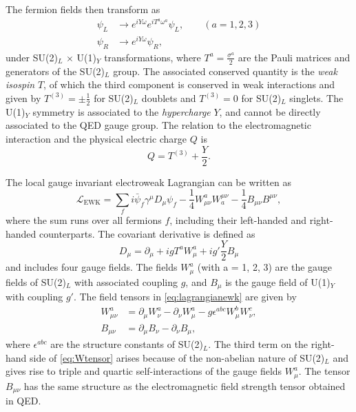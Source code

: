 \noindent The fermion fields then transform as
\begin{align}
  \psi_L & \rightarrow e^{iY\omega} e^{iT^a\omega^a} \psi_L, \qquad (a = 1, 2, 3) \\
  \psi_R & \rightarrow e^{iY\omega} \psi_R,
\end{align}
under SU(2)$_L$ $\times$ U(1)$_Y$ transformations, where $T^a=\frac{\sigma^a}{2}$ are the Pauli matrices and generators of the SU(2)$_L$ group.
The associated conserved quantity is the \emph{weak isospin} $T$, of which the third component is conserved in weak interactions and given by $T^{(3)} = \pm \frac{1}{2}$ for SU(2)$_L$ doublets and $T^{(3)} = 0$ for SU(2)$_L$ singlets.
The U(1)$_Y$ symmetry is associated to the \emph{hypercharge} $Y$, and cannot be directly associated to the QED gauge group.
The relation to the electromagnetic interaction and the physical electric charge $Q$ is
\begin{equation}
  Q = T^{(3)} + \frac{Y}{2}.
\end{equation}

\noindent The local gauge invariant electroweak Lagrangian can be written as
\begin{equation}
  \mathcal{L}_{\text{EWK}} = \sum_f i\bar{\psi}_{f}\gamma^\mu D_\mu \psi_{f} - \frac{1}{4}W_{\mu\nu}^aW^{\mu\nu}_{a} - \frac{1}{4} B_{\mu\nu}B^{\mu\nu}, 
  \label{eq:lagrangianewk}
\end{equation}
where the sum runs over all fermions $f$, including their left-handed and right-handed counterparts.
The covariant derivative is defined as
\begin{equation}
  D_\mu = \partial_\mu + igT^aW_\mu^a + ig'\frac{Y}{2}B_\mu 
  \label{eq:covdevewk}
\end{equation}
and includes four gauge fields. The fields $W^a_\mu$ (with a = 1, 2, 3) are the gauge fields of SU(2)$_L$ with associated coupling $g$, and $B_\mu$ is the gauge field of U(1)$_Y$ with coupling $g'$.
The field tensors in \cref{eq:lagrangianewk} are given by
\begin{align}
  W_{\mu\nu}^a & = \partial_\mu W_\nu^a - \partial_\nu W_\mu^a - g \epsilon^{abc} W^b_\mu W^c_\nu, \label{eq:Wtensor} \\
  B_{\mu\nu}   & = \partial_\mu B_\nu - \partial_\nu B_\mu,
\end{align}
where $\epsilon^{abc}$ are the structure constants of SU(2)$_L$. The third term on the right-hand side of \cref{eq:Wtensor} arises because of the non-abelian nature of SU(2)$_L$ and gives rise to triple and quartic self-interactions of the gauge fields $W_{\mu}^a$.
The tensor $B_{\mu\nu}$ has the same structure as the electromagnetic field strength tensor obtained in QED.

